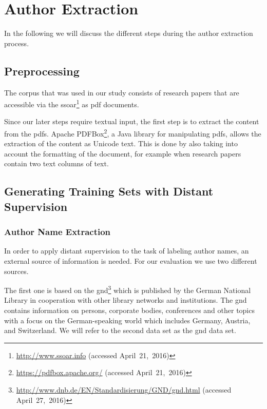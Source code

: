 \chapter{Author Extraction}\label{cha:author-extraction}
In the following we will discuss the different steps during the author extraction process.

\section{Preprocessing}\label{sec:ae-preprocessing}

The corpus that was used in our study consists of  research papers that are accessible via the \gls{ssoar}\footnote{\url{http://www.ssoar.info} (accessed April~21,~2016)} as \gls{pdf} documents.

Since our later steps require textual input, the first step is to extract the content from the \glspl{pdf}.
Apache PDFBox\footnote{\url{https://pdfbox.apache.org/} (accessed April~21,~2016)}, a Java library for manipulating \glspl{pdf}, allows the extraction of the content as Unicode text.
This is done by also taking into account the formatting of the document, for example when research papers contain two text columns of text.

\section{Generating Training Sets with Distant Supervision}\label{sec:ae-distant-supervision}

\subsection{Author Name Extraction}

In order to apply distant supervision to the task of labeling author names, an external source of information is needed.
For our evaluation we use two different sources.

\bigskip

The first one is based on the \acrfull{gnd}\footnote{\url{http://www.dnb.de/EN/Standardisierung/GND/gnd.html} (accessed April~27,~2016)} which is published by the German National Library in cooperation with other library networks and institutions.
The \gls{gnd} contains information on persons, corporate bodies, conferences and other topics with a focus on the German-speaking world which includes Germany, Austria, and Switzerland.
We will refer to the second data set as the \gls{gnd} data set.

